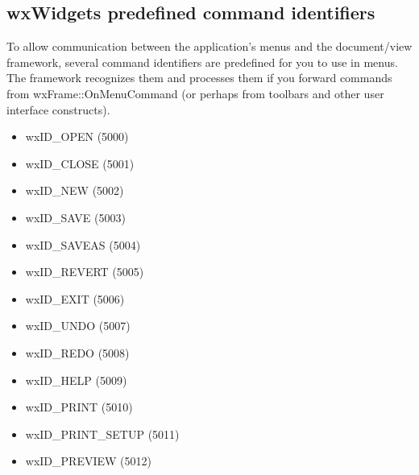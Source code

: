 \subsection{wxWidgets predefined command identifiers}\label{predefinedids}

To allow communication between the application's menus and the
document/view framework, several command identifiers are predefined for you
to use in menus. The framework recognizes them and processes them if you
forward commands from wxFrame::OnMenuCommand (or perhaps from toolbars and
other user interface constructs).

\begin{itemize}\itemsep=0pt
\item wxID\_OPEN (5000)
\item wxID\_CLOSE (5001)
\item wxID\_NEW (5002)
\item wxID\_SAVE (5003)
\item wxID\_SAVEAS (5004)
\item wxID\_REVERT (5005)
\item wxID\_EXIT (5006)
\item wxID\_UNDO (5007)
\item wxID\_REDO (5008)
\item wxID\_HELP (5009)
\item wxID\_PRINT (5010)
\item wxID\_PRINT\_SETUP (5011)
\item wxID\_PREVIEW (5012)
\end{itemize}


